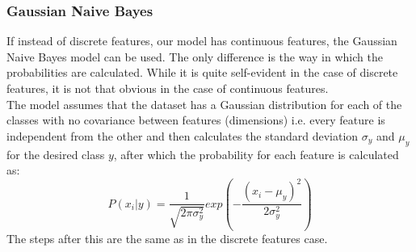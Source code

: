 \documentclass[12pt]{article}
\begin{document}
\subsubsection*{Gaussian Naive Bayes}
If instead of discrete features, our model has continuous features, the Gaussian Naive Bayes model can be used. The only difference is the way in which the probabilities are calculated. While it is quite self-evident in the case of discrete features, it is not that obvious in the case of continuous features.\\
The model assumes that the dataset has a Gaussian distribution for each of the classes with no covariance between features (dimensions) i.e. every feature is independent from the other and then calculates the standard deviation $\sigma_y$ and $\mu_y$ for the desired class $y$, after which the probability for each feature is calculated as:
\begin{equation}
    P(x_i|y) = \frac{1}{\sqrt{2\pi\sigma_y^2}} exp \left (-\frac{(x_i-\mu_y)^2}{2\sigma_y^2}\right)
\end{equation}
The steps after this are the same as in the discrete features case.
\end{document}
